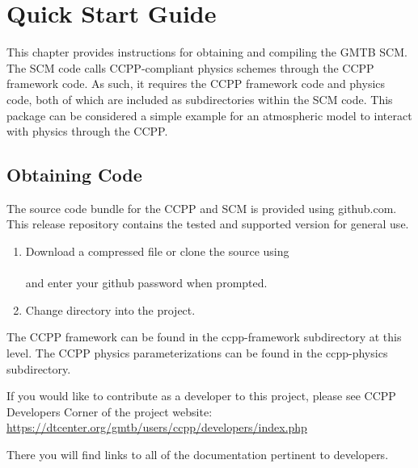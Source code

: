 \chapter{Quick Start Guide}
\label{chapter: quick}
\setlength{\parskip}{12pt}

This chapter provides instructions for obtaining and compiling 
the GMTB SCM. The SCM code calls CCPP-compliant
physics schemes through the CCPP framework code. As such, it requires the
CCPP framework code and physics code, both of which are included as 
subdirectories within the SCM code. This package can be considered a simple example
for an atmospheric model to interact with physics through the CCPP.

\section{Obtaining Code}

The source code bundle for the CCPP and SCM is provided using github.com.  This release repository contains the tested and supported version for general use.  

\begin{enumerate}

	\item Download a compressed file or clone the source using\\

	\\

	and enter your github password when prompted.\\

	\item Change directory into the project.\\


\end{enumerate}

The CCPP framework can be found in the ccpp-framework subdirectory at this level.  The CCPP physics parameterizations can be found in the ccpp-physics subdirectory.

If you would like to contribute as a developer to this project, please see CCPP Developers Corner of the project website:\\

\url{https://dtcenter.org/gmtb/users/ccpp/developers/index.php}

There you will find links to all of the documentation pertinent to developers. 

